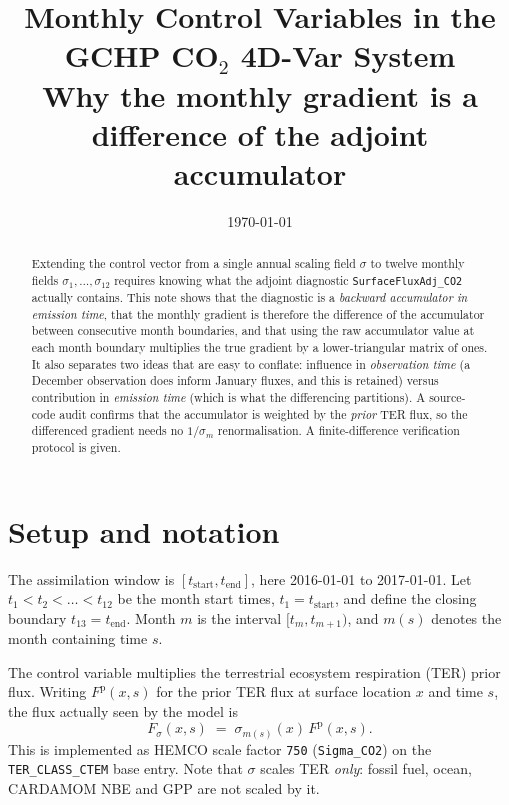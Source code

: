 \documentclass[12pt]{article}
\title{\textbf{Monthly Control Variables in the GCHP CO$_2$ 4D-Var System}\\
\large Why the monthly gradient is a difference of the adjoint accumulator}
\author{}
\date{\today}
\newcommand{\Fprior}{F^{\mathrm{p}}}
\newcommand{\tend}{t_{\mathrm{end}}}
\newcommand{\tstart}{t_{\mathrm{start}}}
\begin{document}
\maketitle

\begin{abstract}
Extending the control vector from a single annual scaling field $\sigma$ to twelve
monthly fields $\sigma_1,\dots,\sigma_{12}$ requires knowing what the adjoint
diagnostic \texttt{SurfaceFluxAdj\_CO2} actually contains. This note shows that the
diagnostic is a \emph{backward accumulator in emission time}, that the monthly
gradient is therefore the difference of the accumulator between consecutive month
boundaries, and that using the raw accumulator value at each month boundary
multiplies the true gradient by a lower-triangular matrix of ones. It also
separates two ideas that are easy to conflate: influence in \emph{observation
time} (a December observation does inform January fluxes, and this is retained)
versus contribution in \emph{emission time} (which is what the differencing
partitions). A source-code audit confirms that the accumulator is weighted by the
\emph{prior} TER flux, so the differenced gradient needs no $1/\sigma_m$
renormalisation. A finite-difference verification protocol is given.
\end{abstract}

\section{Setup and notation}

The assimilation window is $[\tstart,\tend]$, here 2016-01-01 to 2017-01-01.
Let $t_1 < t_2 < \dots < t_{12}$ be the month start times, $t_1 = \tstart$, and
define the closing boundary $t_{13} = \tend$. Month $m$ is the interval
$[t_m, t_{m+1})$, and $m(s)$ denotes the month containing time $s$.

The control variable multiplies the terrestrial ecosystem respiration (TER) prior
flux. Writing $\Fprior(x,s)$ for the prior TER flux at surface location $x$ and
time $s$, the flux actually seen by the model is
%
\begin{equation}
  F_\sigma(x,s) \;=\; \sigma_{m(s)}(x)\,\Fprior(x,s).
  \label{eq:flux}
\end{equation}
%
This is implemented as HEMCO scale factor \texttt{750} (\texttt{Sigma\_CO2}) on the
\texttt{TER\_CLASS\_CTEM} base entry. Note that $\sigma$ scales TER \emph{only}:
fossil fuel, ocean, CARDAMOM NBE and GPP are not scaled by it.
\end{document}
